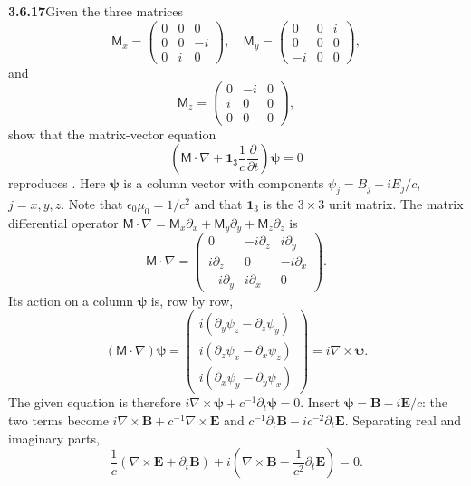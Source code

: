 \par\bigskip
\noindent\textbf{3.6.17}\quad Given the three matrices
\[
\mathsf{M}_{x}=\begin{pmatrix}0&0&0\\0&0&-i\\0&i&0\end{pmatrix},\quad
\mathsf{M}_{y}=\begin{pmatrix}0&0&i\\0&0&0\\-i&0&0\end{pmatrix},
\]
and
\[
\mathsf{M}_{z}=\begin{pmatrix}0&-i&0\\i&0&0\\0&0&0\end{pmatrix},
\]
show that the matrix-vector equation
\[
\left(\mathsf{M}\cdot\nabla+\mathbf{1}_{3}\frac{1}{c}\frac{\partial}
{\partial t}\right)\boldsymbol{\psi}=0
\]
reproduces . Here $\boldsymbol{\psi}$ is a column
vector with components $\psi_{j}=B_{j}-iE_{j}/c$, $j=x,y,z$. Note that
$\epsilon_{0}\mu_{0}=1/c^{2}$ and that $\mathbf{1}_{3}$ is the $3\times3$ unit
matrix.
\solution
The matrix differential operator
$\mathsf M\cdot\nabla=\mathsf M_x\partial_x+\mathsf M_y\partial_y
+\mathsf M_z\partial_z$ is
\[
\mathsf M\cdot\nabla=
\begin{pmatrix}
0&-i\partial_z&i\partial_y\\
i\partial_z&0&-i\partial_x\\
-i\partial_y&i\partial_x&0
\end{pmatrix}.
\]
Its action on a column $\boldsymbol\psi$ is, row by row,
\[
(\mathsf M\cdot\nabla)\boldsymbol\psi=
\begin{pmatrix}
i(\partial_y\psi_z-\partial_z\psi_y)\\
i(\partial_z\psi_x-\partial_x\psi_z)\\
i(\partial_x\psi_y-\partial_y\psi_x)
\end{pmatrix}
=i\nabla\times\boldsymbol\psi.
\]
The given equation is therefore
$i\nabla\times\boldsymbol\psi+c^{-1}\partial_t\boldsymbol\psi=0$.
Insert $\boldsymbol\psi=\mathbf B-i\mathbf E/c$: the two terms become
$i\nabla\times\mathbf B+c^{-1}\nabla\times\mathbf E$ and
$c^{-1}\partial_t\mathbf B-ic^{-2}\partial_t\mathbf E$. Separating real
and imaginary parts,
\[
\frac1c(\nabla\times\mathbf E+\partial_t\mathbf B)
+i\left(\nabla\times\mathbf B-\frac1{c^2}\partial_t\mathbf E\right)=0.
\]
